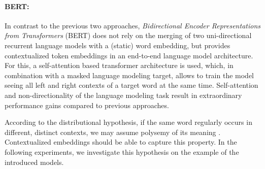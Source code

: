 \documentclass[11pt]{article}
\begin{document}
\paragraph{BERT:}In contrast to the previous two approaches, \textit{Bidirectional Encoder Representations from Transformers} (BERT) \cite{devlin.2019} does not rely on the merging of two uni-directional recurrent language models with a (static) word embedding, but provides contextualized token embeddings in an end-to-end language model architecture. 
For this, a self-attention based transformer architecture is used, which, in combination with a masked language modeling target, allows to train the model seeing all left and right contexts of a target word at the same time. 
Self-attention and non-directionality of the language modeling task result in extraordinary performance gains compared to previous approaches.

\vspace{1em}
\noindent
According to the distributional hypothesis, if the same word regularly occurs in different, distinct contexts, we may assume polysemy of its meaning \cite{miller1991contextual}.
Contextualized embeddings should be able to capture this property. 
In the following experiments, we investigate this hypothesis on the example of the introduced models.

\begin{table*}[t]
\caption{Properties of our datasets. For the test sets (Te), we do not report  since they are not used as kNN training instances.}\label{tab:datasets}
\end{table*}
\end{document}
